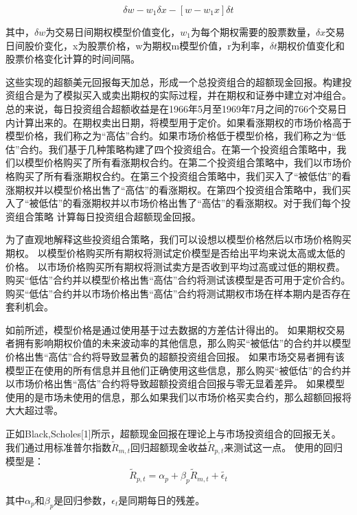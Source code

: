 \begin{equation}
    \delta{w}-w_1\delta{x}-[w-w_1x]\delta{t}
\end{equation}
\par{
    其中，$\delta{w}$为交易日间期权模型价值变化，$w_1$为每个期权需要的股票数量，$\delta{x}$交易日间股价变化，x为股票价格，w为期权m模型价值，r为利率，$\delta{t}$期权价值变化和股票价格变化计算的时间间隔。
}
\par{
    这些实现的超额美元回报每天加总，形成一个总投资组合的超额现金回报。构建投资组合是为了模拟买入或卖出期权的实际过程，并在期权和证券中建立对冲组合。总的来说，每日投资组合超额收益是在1966年5月至1969年7月之间的766个交易日内计算出来的。在期权卖出日期，将模型用于定价。如果看涨期权的市场价格高于模型价格，我们称之为“高估”合约。如果市场价格低于模型价格，我们称之为“低估”合约。我们基于几种策略构建了四个投资组合。在第一个投资组合策略中，我们以模型价格购买了所有看涨期权合约。在第二个投资组合策略中，我们以市场价格购买了所有看涨期权合约。在第三个投资组合策略中，我们买入了“被低估”的看涨期权并以模型价格出售了“高估”的看涨期权。在第四个投资组合策略中，我们买入了“被低估”的看涨期权并以市场价格出售了“高估”的看涨期权。对于我们每个投资组合策略
计算每日投资组合超额现金回报。
}
\par{
    为了直观地解释这些投资组合策略，我们可以设想以模型价格然后以市场价格购买期权。 以模型价格购买所有期权将测试定价模型是否给出平均来说太高或太低的价格。 以市场价格购买所有期权将测试卖方是否收到平均过高或过低的期权费。 购买“低估”合约并以模型价格出售“高估”合约将测试该模型是否可用于定价合约。 购买“低估”合约并以市场价格出售“高估”合约将测试期权市场在样本期内是否存在套利机会。
}
\par{
    如前所述，模型价格是通过使用基于过去数据的方差估计得出的。 如果期权交易者拥有影响期权价值的未来波动率的其他信息，那么购买“被低估”的合约并以模型价格出售“高估”合约将导致显著负的超额投资组合回报。 如果市场交易者拥有该模型正在使用的所有信息并且他们正确使用这些信息，那么购买“被低估”的合约并以市场价格出售“高估”合约将导致超额投资组合回报与零无显着差异。 如果模型使用的是市场未使用的信息，那么如果我们以市场价格买卖合约，那么超额回报将大大超过零。
}
\par{
    正如Black,Scholes[1]所示，超额现金回报在理论上与市场投资组合的回报无关。 我们通过用标准普尔指数$\tilde{R}_{m,t}$回归超额现金收益$\tilde{R}_{p,t}$来测试这一点。 使用的回归模型是：
}
\begin{equation}
    \tilde{R}_{p,t}=\alpha_p+\beta_p\tilde{R}_{m,t}+\tilde{\epsilon_t}
\end{equation}
\par{
    其中$\alpha_p$和$\beta_p$是回归参数，$\epsilon_t$是同期每日的残差。
}
